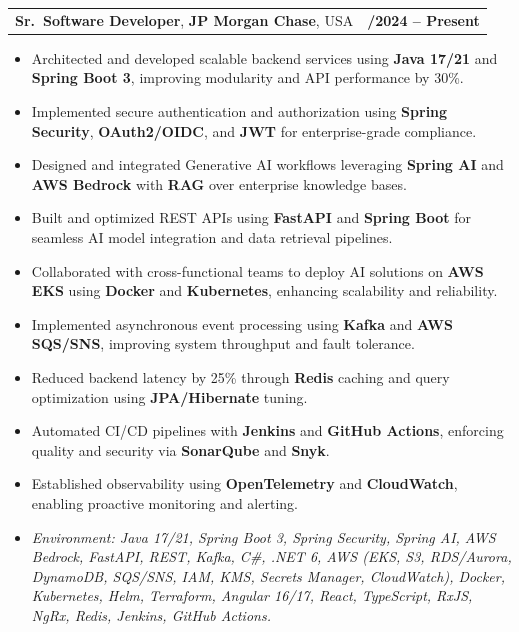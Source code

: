 \documentclass[letterpaper,11pt]{article}
\makeatletter
\newcommand{\resumeItem}[1]{
  \item\footnotesize{
    {#1 \vspace{-2pt}}
  }
}
\newcommand{\resumeSubheading}[4]{
  \vspace{-2pt}\item
    \begin{tabular*}{1.0\textwidth}[t]{l@{\extracolsep{\fill}}r}
      \textbf{\fontsize{10pt}{14pt}\selectfont #3}, \textbf{\fontsize{10pt}{14pt}\selectfont #1}, \fontsize{10pt}{14pt}\selectfont #4 & \textbf{\fontsize{10pt}{14pt}\selectfont #2} \\
    \end{tabular*}\vspace{-7pt}
}
\newcommand{\resumeItemListStart}{\begin{itemize}[leftmargin=*]}
\newcommand{\resumeItemListEnd}{\end{itemize}\vspace{-5pt}}
\makeatother
\begin{document}
\resumeSubheading
{JP Morgan Chase}{09/2024 -- Present}
{Sr.\ Software Developer}{USA}
\resumeItemListStart
  \resumeItem{Architected and developed scalable backend services using \textbf{Java 17/21} and \textbf{Spring Boot 3}, improving modularity and API performance by 30\%.}
  \resumeItem{Implemented secure authentication and authorization using \textbf{Spring Security}, \textbf{OAuth2/OIDC}, and \textbf{JWT} for enterprise-grade compliance.}
  \resumeItem{Designed and integrated Generative AI workflows leveraging \textbf{Spring AI} and \textbf{AWS Bedrock} with \textbf{RAG} over enterprise knowledge bases.}
  \resumeItem{Built and optimized REST APIs using \textbf{FastAPI} and \textbf{Spring Boot} for seamless AI model integration and data retrieval pipelines.}
  \resumeItem{Collaborated with cross-functional teams to deploy AI solutions on \textbf{AWS EKS} using \textbf{Docker} and \textbf{Kubernetes}, enhancing scalability and reliability.}
  \resumeItem{Implemented asynchronous event processing using \textbf{Kafka} and \textbf{AWS SQS/SNS}, improving system throughput and fault tolerance.}
  \resumeItem{Reduced backend latency by 25\% through \textbf{Redis} caching and query optimization using \textbf{JPA/Hibernate} tuning.}
  \resumeItem{Automated CI/CD pipelines with \textbf{Jenkins} and \textbf{GitHub Actions}, enforcing quality and security via \textbf{SonarQube} and \textbf{Snyk}.}
  \resumeItem{Established observability using \textbf{OpenTelemetry} and \textbf{CloudWatch}, enabling proactive monitoring and alerting.}
  \resumeItem{\textit{Environment: Java 17/21, Spring Boot 3, Spring Security, Spring AI, AWS Bedrock, FastAPI, REST, Kafka, C\#, .NET 6, AWS (EKS, S3, RDS/Aurora, DynamoDB, SQS/SNS, IAM, KMS, Secrets Manager, CloudWatch), Docker, Kubernetes, Helm, Terraform, Angular 16/17, React, TypeScript, RxJS, NgRx, Redis, Jenkins, GitHub Actions.}}
\resumeItemListEnd
\end{document}
